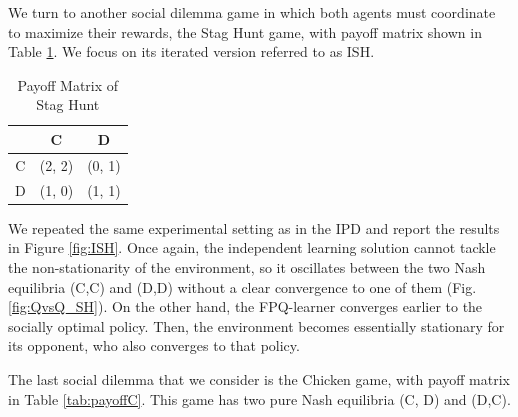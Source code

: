 \documentclass[letterpaper]{article} %
\begin{document}
We turn to another social dilemma game in which both agents must coordinate to maximize their rewards, the Stag Hunt game,
with payoff matrix shown in Table \ref{tab:payoffSG}. We focus on 
its iterated version referred to as ISH.

\begin{table}[h!]
\begin{center}
\begin{tabular}{c|c|c}
\hline
 & C & D \\
\hline
C & (2, 2) & (0, 1) \\
\hline
D & (1, 0) & (1, 1)  \\
\hline
\end{tabular}
\end{center}
\caption{Payoff Matrix of Stag Hunt}
\label{tab:payoffSG}
\vspace{-2ex}
\end{table}
We repeated the same experimental setting as in the IPD and report the results in Figure \ref{fig:ISH}. Once again, the independent learning solution cannot
tackle the non-stationarity of the environment, so it oscillates between the two Nash equilibria (C,C) and (D,D) without a clear convergence to one of them (Fig. \ref{fig:QvsQ_SH}). On the other hand, the FPQ-learner converges earlier to the socially optimal policy. Then, the environment becomes essentially stationary for its opponent, who also converges to that policy.




The last social dilemma that we consider is the Chicken game, with payoff matrix in Table \ref{tab:payoffC}. This game has two pure Nash equilibria (C, D) and (D,C).
\end{document}
